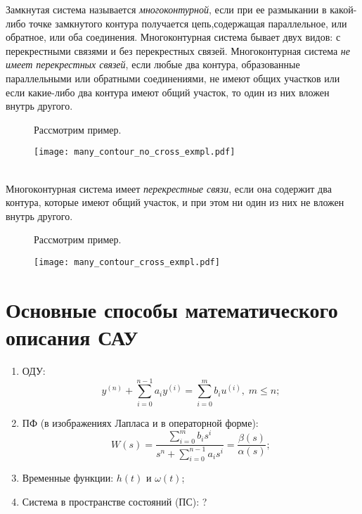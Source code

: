 \documentclass[../../TAU.tex]{subfiles}
\begin{document}
     Замкнутая система называется {\it многоконтурной}, если при ее размыкании в какой-либо точке замкнутого контура получается цепь,содержащая параллельное, или обратное, или оба соединения. Многоконтурная система бывает двух видов: с перекрестными связями и без перекрестных связей.
    Многоконтурная система {\it не имеет перекрестных связей}, если любые два контура, образованные параллельными или обратными соединениями, не имеют общих участков или если какие-либо два контура имеют общий участок, то один из них вложен внутрь другого.
    \begin{figure}[h]
        \begin{minipage}[h]{0.19\linewidth}
            Рассмотрим пример.
            \vspace{3cm}
        \end{minipage}
        \begin{minipage}[h]{0.80\linewidth}
            \texttt{[image: many\_contour\_no\_cross\_exmpl.pdf]}
        \end{minipage}
    \end{figure}\\
    Многоконтурная система имеет {\it перекрестные связи}, если она содержит два контура, которые имеют общий участок, и при этом ни один из них не вложен внутрь другого.
    \begin{figure}[h]
        \begin{minipage}[h]{0.19\linewidth}
            Рассмотрим пример.
            \vspace{3cm}
        \end{minipage}
        \begin{minipage}[h]{0.80\linewidth}
            \texttt{[image: many\_contour\_cross\_exmpl.pdf]}
        \end{minipage}
    \end{figure}

\section{Основные способы математического описания САУ}
    \begin{enumerate}
        \item ОДУ:
            $$
                y^{(n)}+\sum_{i=0}^{n-1}a_iy^{(i)}=\sum_{i=0}^{m}b_iu^{(i)},\; m \le n;
            $$
        \item ПФ (в изображениях Лапласа и в операторной форме):
            $$
                W(s) = \frac{\sum_{i=0}^{m}b_is^i}{s^n+\sum_{i=0}^{n-1}a_is^{i}} = \frac{\beta(s)}{\alpha(s)};
            $$
        \item Временные функции: $h(t)$ и $\omega(t)$;
        \item Система в пространстве состояний (ПС): ?
    \end{enumerate}
\end{document}
